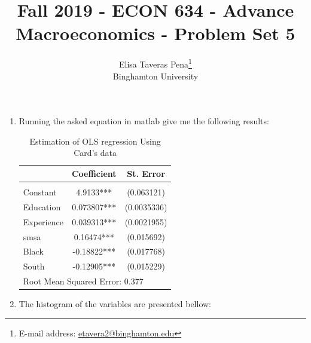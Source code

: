 \documentclass[12pt]{article}%
\begin{document}
\title{Fall 2019 - ECON 634 - Advance Macroeconomics - Problem Set 5}
\author{Elisa Taveras Pena\footnote{E-mail address: \href{mailto:etavera2@binghamton.edu}{etavera2@binghamton.edu}  }\\
Binghamton University}
\maketitle

\sloppy%

\onehalfspacing

\begin{enumerate}
	\item Running the asked equation in matlab give me the following results:
	
	 \begin {table}[H]
	\begin{center}
			\caption {Estimation of OLS regression Using Card's data}
			{
				\begin{tabular}{l*{2}{c}}
					\hline
					&\multicolumn{1}{c}{Coefficient}&\multicolumn{1}{c}{St. Error}\\
					\hline\\
					[.25mm]
				Constant      &      4.9133***   &  (0.063121)   \\  
				Education         &    0.073807*** &   (0.0035336)  \\  
				Experience    &  0.039313*** &    (0.0021955)   \\ 
				smsa          &      0.16474***   &  (0.015692)   \\
				Black        &       -0.18822***  &  (0.017768)   \\
				South        &       -0.12905***  & (0.015229)   \\ 
				\hline
				\multicolumn{3}{l}{Root Mean Squared Error: 0.377}\\
				\hline	
				\end{tabular}
			}
	\end{center} 
	\end {table}
	
	\item The histogram of the variables are presented bellow:
	

\end{enumerate}
\end{document}
